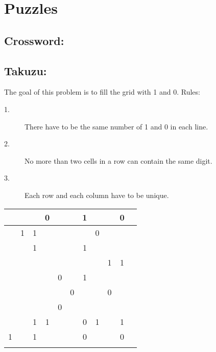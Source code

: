 \documentclass{article}
\begin{document}
\section*{Puzzles}

\subsection*{Crossword:}


\subsection*{Takuzu:}
The goal of this problem is to fill the grid with 1 and 0. 
Rules:
\begin{description}
\item[1.] There have to be the same number of 1 and 0 in each line.
\item[2.] No more than two cells in a row can contain the same digit.
\item[3.] Each row and each column have to be unique.
\end{description}

\begin{table}[ht]
\centering
\begin{tabular}{|c|c|c|c|c|c|c|c|c|c|c|}
\hline   &   &   & 0 &   &   & 1 &   &   & 0 \\ 
\hline   & 1 & 1 &   &   &   &   & 0 &   &   \\ 
\hline   &   & 1 &   &   &   & 1 &   &   &   \\ 
\hline   &   &   &   &   &   &   &   & 1 & 1 \\ 
\hline   &   &   &   & 0 &   & 1 &   &   &   \\ 
\hline   &   &   &   &   & 0 &   &   & 0 &   \\ 
\hline   &   &   &   & 0 &   &   &   &   &   \\ 
\hline   &   & 1 & 1 &   &   & 0 & 1 &   & 1 \\ 
\hline 1 &   & 1 &   &   &   & 0 &   &   & 0 \\ 
\hline   &   &   &   &   &   &   &   &   &   \\
\hline
\end{tabular}
\end{table} 
\end{document}
